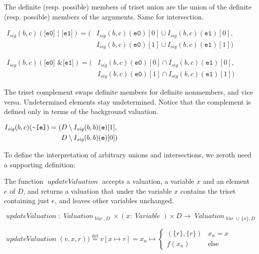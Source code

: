 \documentclass[oneside,12pt]{book}
\theoremstyle{definition}
\theoremstyle{remark}
\newcommand{\tde}{\raisebox{0.5ex}{\texttildelow}}
\newcommand\var[1]{\mathop{\mathit{#1}}\nolimits}
\newcommand{\sig}{\var{sig}}
\newcommand{\Var}{\var{Var}}
\newcommand{\updateValuation}{\var{updateValuation}}
\newcommand{\defeq}{\stackrel{\text{def}}{=}}
\newcommand{\Variable}{\var{Variable}}
\newcommand{\Valuation}{\var{Valuation}}
\begin{document}
The definite (resp. possible) members of triset union are the union
of the definite (resp. possible) members of the arguments. Same for intersection.

\begin{defBox}
  $\begin{aligned}
    I_{\sig}(b,c)(\texttt{[e0] | [e1]}) =
    (&I_{\sig}(b,c)(\texttt{e0})[0] \cup I_{\sig}(b,c)(\texttt{e1})[0], \\
    &I_{\sig}(b,c)(\texttt{e0})[1] \cup I_{\sig}(b,c)(\texttt{e1})[1])
    \end{aligned}$
  
  \bigskip \noindent $\begin{aligned}
    I_{\sig}(b,c)(\texttt{[e0] \& [e1]}) =
    (&I_{\sig}(b,c)(\texttt{e0})[0] \cap I_{\sig}(b,c)(\texttt{e1})[0], \\
    &I_{\sig}(b,c)(\texttt{e0})[1] \cap I_{\sig}(b,c)(\texttt{e1})[1])
    \end{aligned}$
\end{defBox}

The triset complement swaps definite members for definite nonmembers,
and vice versa. Undetermined elements stay undetermined. Notice that
the complement is defined only in terms of the background valuation.

\begin{defBox}
  $\begin{aligned}
    I_{\sig}(b,c)(\texttt{\tde [e]}) =
    (&D \setminus I_{\sig}(b,b)(\texttt{e})[1], \\
    &D \setminus I_{\sig}(b,b)(\texttt{e})[0])
    \end{aligned}$
\end{defBox}

To define the interpretation of arbitrary unions and intersections, we zeroth
need a supporting definition:

The function $\updateValuation$  accepts a valuation, a variable $x$ and an element
$e$ of $D$, and returns a valuation that under the variable $x$ contains the triset
containing just $e$, and leaves other variables unchanged.

\begin{defBox}
  $\updateValuation\colon
    \Valuation_{\Var,D} \times (x\colon \Variable) \times D
      \to \Valuation_{\Var \cup\,\{x\},D}$
  
  \medskip \noindent
  $\updateValuation(v, x, r)) \defeq v[x \mapsto r] = x_n \mapsto \begin{cases}
  (\{r\},\{r\}) & x_n = x\\
  f(x_n) & \text{else}
  \end{cases}$
\end{defBox}
\end{document}
